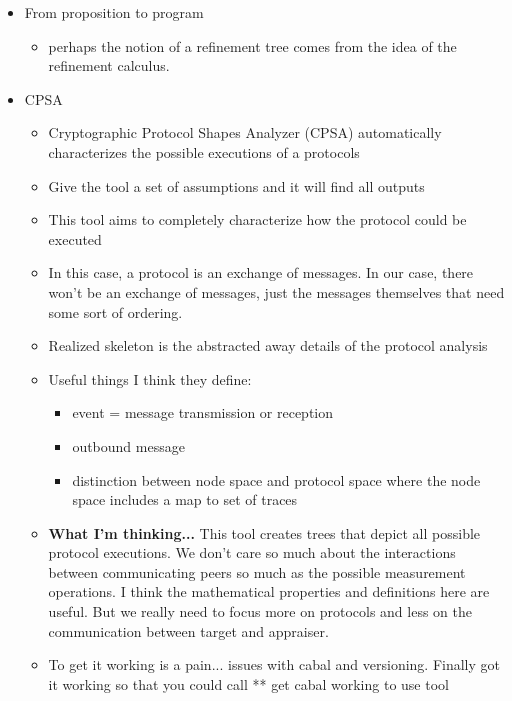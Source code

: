 \documentclass[12pt, letterpaper]{article}
\begin{document}
\begin{itemize}
    \item From proposition to program 
    \begin{itemize}
        \item perhaps the notion of a refinement tree comes from the idea of the refinement calculus. 
    \end{itemize}
    \item CPSA 
    \begin{itemize}
        \item Cryptographic Protocol Shapes Analyzer (CPSA) automatically characterizes the possible executions of a protocols
        \item Give the tool a set of assumptions and it will find all outputs 
        \item This tool aims to completely characterize how the protocol could be executed
        \item In this case, a protocol is an exchange of messages. In our case, there won't be an exchange of messages, just the messages themselves that need some sort of ordering.
        \item Realized skeleton is the abstracted away details of the protocol analysis

        \item Useful things I think they define: 
        \begin{itemize}
            \item event = message transmission or reception 
            \item outbound message
            \item distinction between node space and protocol space where the node space includes a map to set of traces 
        \end{itemize}
        
        \item \textbf{What I'm thinking...} This tool creates trees that depict all possible protocol executions. We don't care so much about the interactions between communicating peers so much as the possible measurement operations. I think the mathematical properties and definitions here are useful. But we really need to focus more on protocols and less on the communication between target and appraiser. 


        \item To get it working is a pain...  issues with cabal and versioning. Finally got it working so that you could call ** get cabal working to use tool


\end{itemize}
\end{itemize}
\end{document}
